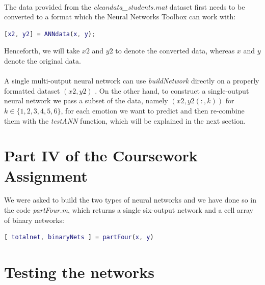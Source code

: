 \documentclass[a4paper,12pt,oneside,final]{report}
\newenvironment{changemargin}[2]{\begin{list}{}{%
\setlength{\topsep}{0pt}%
\setlength{\leftmargin}{0pt}%
\setlength{\rightmargin}{0pt}%
\setlength{\listparindent}{\parindent}%
\setlength{\itemindent}{\parindent}%
\setlength{\parsep}{0pt plus 1pt}%
\addtolength{\leftmargin}{#1}%
\addtolength{\rightmargin}{#2}%
}\item }{\end{list}}
\begin{document}
\paragraph{}
The data provided from the \textit{cleandata\_students.mat} dataset first needs to be converted to a format which the Neural Networks Toolbox can work with:
\begin{changemargin}{-5mm}{-5mm}
\begin{lstlisting}[language=Matlab, frame=single]
[x2, y2] = ANNdata(x, y);
\end{lstlisting}
\end{changemargin}
Henceforth, we will take $x2$ and $y2$ to denote the converted data, whereas $x$ and $y$ denote the original data.
\paragraph{}
A single multi-output neural network can use \textit{buildNetwork} directly on a properly formatted dataset $(x2,y2)$ .  On the other hand, to construct a single-output neural network we pass a subset of the data, namely $(x2,y2(:,k))$ for $k\in\{1,2,3,4,5,6\}$,  for each emotion we want to predict and then re-combine them with the \textit{testANN} function, which will be explained in the next section.

\section{Part IV of the Coursework Assignment}
We were asked to build the two types of neural networks and we have done so in the code \textit{partFour.m}, which returns a single six-output network and a cell array of binary networks:
\begin{changemargin}{-5mm}{-5mm}
\begin{lstlisting}[language=Matlab, frame=single]
[ totalnet, binaryNets ] = partFour(x, y)
\end{lstlisting}
\end{changemargin}

\section{Testing the networks}
\end{document}
